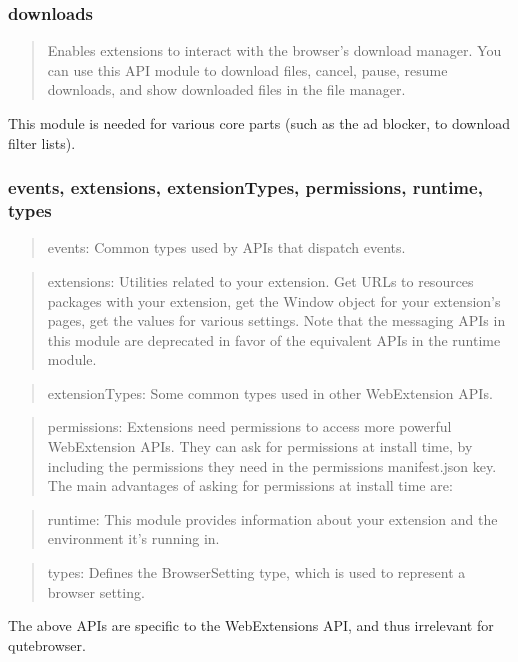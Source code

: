 \subsubsection{downloads}
\begin{quote}
Enables extensions to interact with the browser's download manager. You can use this API module to download files, cancel, pause, resume downloads, and show downloaded files in the file manager.
\end{quote}

This module is needed for various core parts (such as the ad blocker, to
download filter lists).

\subsubsection{events, extensions, extensionTypes, permissions, runtime, types}
\begin{quote}
events: Common types used by APIs that dispatch events.
\end{quote}
\begin{quote}
extensions: Utilities related to your extension. Get URLs to resources packages with your extension, get the Window object for your extension's pages, get the values for various settings. Note that the messaging APIs in this module are deprecated in favor of the equivalent APIs in the runtime module.
\end{quote}
\begin{quote}
extensionTypes: Some common types used in other WebExtension APIs.
\end{quote}
\begin{quote}
permissions: Extensions need permissions to access more powerful WebExtension APIs. They can ask for permissions at install time, by including the permissions they need in the permissions manifest.json key. The main advantages of asking for permissions at install time are:
\end{quote}
\begin{quote}
runtime: This module provides information about your extension and the environment it's running in.
\end{quote}
\begin{quote}
types: Defines the BrowserSetting type, which is used to represent a browser setting.
\end{quote}

The above APIs are specific to the WebExtensions API, and thus irrelevant for
qutebrowser.

